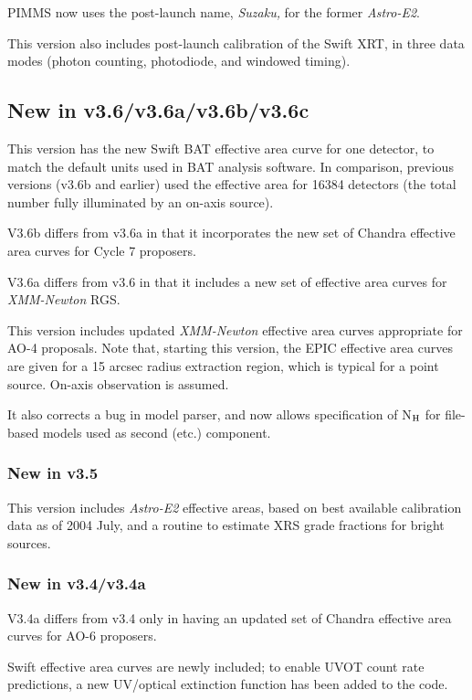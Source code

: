 PIMMS now uses the post-launch name, {\em Suzaku,\/}
for the former {\em Astro-E2\/}.

This version also includes post-launch calibration of the Swift XRT,
in three data modes (photon counting, photodiode, and windowed timing).

\subsection{New in v3.6/v3.6a/v3.6b/v3.6c}

This version has the new Swift BAT effective area curve for one detector,
to match the default units used in BAT analysis software.  In comparison,
previous versions (v3.6b and earlier) used the effective area for 16384
detectors (the total number fully illuminated by an on-axis source).

V3.6b differs from v3.6a in that it incorporates the new set of Chandra
effective area curves for Cycle 7 proposers.

V3.6a differs from v3.6 in that it includes a new set of effective
area curves for {\em XMM-Newton\/} RGS.

This version includes updated {\em XMM-Newton\/} effective area curves
appropriate for AO-4 proposals.  Note that, starting this version, the
EPIC effective area curves are given for a 15 arcsec radius extraction
region, which is typical for a point source.  On-axis observation is
assumed.

It also corrects a bug in model parser, and now allows specification
of N$_{\rm H}$ for file-based models used as second (etc.) component.

\subsubsection{New in v3.5}

This version includes {\em Astro-E2\/} effective areas, based on best available
calibration data as of 2004 July, and a routine to estimate XRS grade
fractions for bright sources.

\subsubsection{New in v3.4/v3.4a}

V3.4a differs from v3.4 only in having an updated set of Chandra
effective area curves for AO-6 proposers.

Swift effective area curves are newly included; to enable UVOT
count rate predictions, a new UV/optical extinction function has
been added to the code.

